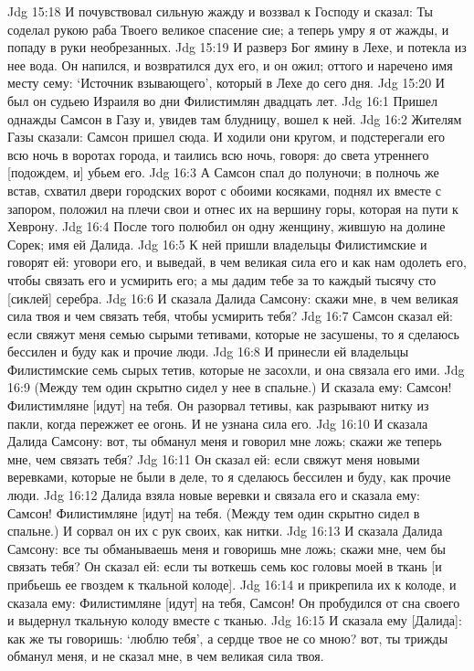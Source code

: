 Jdg 15:18  И почувствовал сильную жажду и воззвал к Господу и сказал: Ты соделал рукою раба Твоего великое спасение сие; а теперь умру я от жажды, и попаду в руки необрезанных.
Jdg 15:19  И разверз Бог ямину в Лехе, и потекла из нее вода. Он напился, и возвратился дух его, и он ожил; оттого и наречено имя месту сему: `Источник взывающего', который в Лехе до сего дня.
Jdg 15:20  И был он судьею Израиля во дни Филистимлян двадцать лет.
Jdg 16:1  Пришел однажды Самсон в Газу и, увидев там блудницу, вошел к ней.
Jdg 16:2  Жителям Газы сказали: Самсон пришел сюда. И ходили они кругом, и подстерегали его всю ночь в воротах города, и таились всю ночь, говоря: до света утреннего [подождем, и] убьем его.
Jdg 16:3  А Самсон спал до полуночи; в полночь же встав, схватил двери городских ворот с обоими косяками, поднял их вместе с запором, положил на плечи свои и отнес их на вершину горы, которая на пути к Хеврону.
Jdg 16:4  После того полюбил он одну женщину, жившую на долине Сорек; имя ей Далида.
Jdg 16:5  К ней пришли владельцы Филистимские и говорят ей: уговори его, и выведай, в чем великая сила его и как нам одолеть его, чтобы связать его и усмирить его; а мы дадим тебе за то каждый тысячу сто [сиклей] серебра.
Jdg 16:6  И сказала Далида Самсону: скажи мне, в чем великая сила твоя и чем связать тебя, чтобы усмирить тебя?
Jdg 16:7  Самсон сказал ей: если свяжут меня семью сырыми тетивами, которые не засушены, то я сделаюсь бессилен и буду как и прочие люди.
Jdg 16:8  И принесли ей владельцы Филистимские семь сырых тетив, которые не засохли, и она связала его ими.
Jdg 16:9  (Между тем один скрытно сидел у нее в спальне.) И сказала ему: Самсон! Филистимляне [идут] на тебя. Он разорвал тетивы, как разрывают нитку из пакли, когда пережжет ее огонь. И не узнана сила его.
Jdg 16:10  И сказала Далида Самсону: вот, ты обманул меня и говорил мне ложь; скажи же теперь мне, чем связать тебя?
Jdg 16:11  Он сказал ей: если свяжут меня новыми веревками, которые не были в деле, то я сделаюсь бессилен и буду, как прочие люди.
Jdg 16:12  Далида взяла новые веревки и связала его и сказала ему: Самсон! Филистимляне [идут] на тебя. (Между тем один скрытно сидел в спальне.) И сорвал он их с рук своих, как нитки.
Jdg 16:13  И сказала Далида Самсону: все ты обманываешь меня и говоришь мне ложь; скажи мне, чем бы связать тебя? Он сказал ей: если ты воткешь семь кос головы моей в ткань [и прибьешь ее гвоздем к ткальной колоде].
Jdg 16:14  и прикрепила их к колоде, и сказала ему: Филистимляне [идут] на тебя, Самсон! Он пробудился от сна своего и выдернул ткальную колоду вместе с тканью.
Jdg 16:15  И сказала ему [Далида]: как же ты говоришь: `люблю тебя', а сердце твое не со мною? вот, ты трижды обманул меня, и не сказал мне, в чем великая сила твоя.
